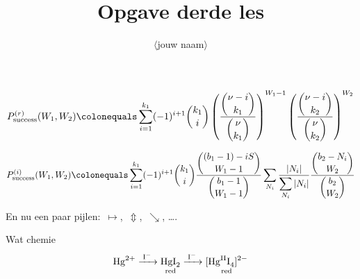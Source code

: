 \documentclass[a4paper]{article}
\title{Opgave derde les}
\author{$\langle$jouw naam$\rangle$}
\begin{document}
\maketitle


\begin{equation}
  \label{eq:p_suc_r_W}
	P_{\text{success}}^{(r)}(W_1, W_2) \colonequals \sum_{i=1}^{k_1} (-1)^{i+1} \dbinom{k_1}{i} \left(\frac{\dbinom{\nu-i}{k_1}}{\dbinom{\nu}{k_1}}\right)^{W_1-1}\left(\frac{\dbinom{\nu-i}{k_2}}{\dbinom{\nu}{k_2}}\right)^{W_2}
\end{equation}

\begin{equation}
	\label{eq:p_suc_bibd_W_weighted}
	P_{\text{success}}^{(i)}(W_1, W_2) \colonequals \sum_{i=1}^{k_1} (-1)^{i+1} \dbinom{k_1}{i} \frac{\dbinom{(b_1-1)-iS}{W_1-1}}{\dbinom{b_1-1}{W_1-1}}	\sum_{N_i}\frac{|N_i|}{\displaystyle\sum_{N_i}|N_i|}\frac{\dbinom{b_2-N_i}{W_2}}{\dbinom{b_2}{W_2}}
\end{equation}

En nu een paar pijlen:~$\longmapsto$,~$\Updownarrow$,~$\searrow$, \ldots.

Wat chemie
\begin{equation}
  \ce{Hg^2+ ->[\ce{I-}]
  $\underset{\mathrm{red}}{\ce{HgI2}}$
  ->C[I-]
  $\underset{\mathrm{red}}{\ce{[Hg^{II}I4]^2-}}$
  }
\end{equation}
\end{document}
